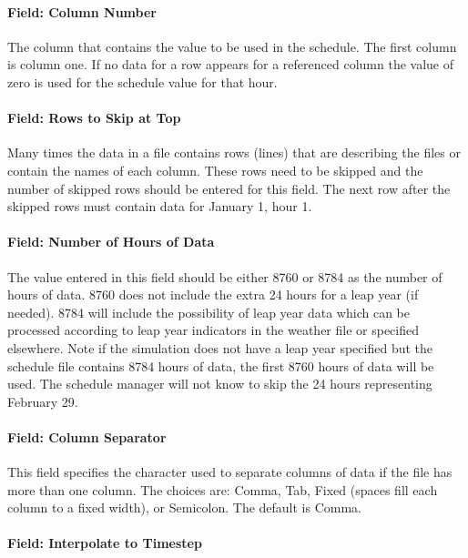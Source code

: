 \paragraph{Field: Column Number}\label{field-column-number}

The column that contains the value to be used in the schedule. The first column is column one. If no data for a row appears for a referenced column the value of zero is used for the schedule value for that hour.

\paragraph{Field: Rows to Skip at Top}\label{field-rows-to-skip-at-top}

Many times the data in a file contains rows (lines) that are describing the files or contain the names of each column. These rows need to be skipped and the number of skipped rows should be entered for this field. The next row after the skipped rows must contain data for January 1, hour 1.

\paragraph{Field: Number of Hours of Data}\label{field-number-of-hours-of-data}

The value entered in this field should be either 8760 or 8784 as the number of hours of data. 8760 does not include the extra 24 hours for a leap year (if needed). 8784 will include the possibility of leap year data which can be processed according to leap year indicators in the weather file or specified elsewhere. Note if the simulation does not have a leap year specified but the schedule file contains 8784 hours of data, the first 8760 hours of data will be used. The schedule manager will not know to skip the 24 hours representing February 29.

\paragraph{Field: Column Separator}\label{field-column-separator-001}

This field specifies the character used to separate columns of data if the file has more than one column. The choices are: Comma, Tab, Fixed (spaces fill each column to a fixed width), or Semicolon. The default is Comma.

\paragraph{Field: Interpolate to Timestep}\label{field-interpolate-to-timestep-2}

